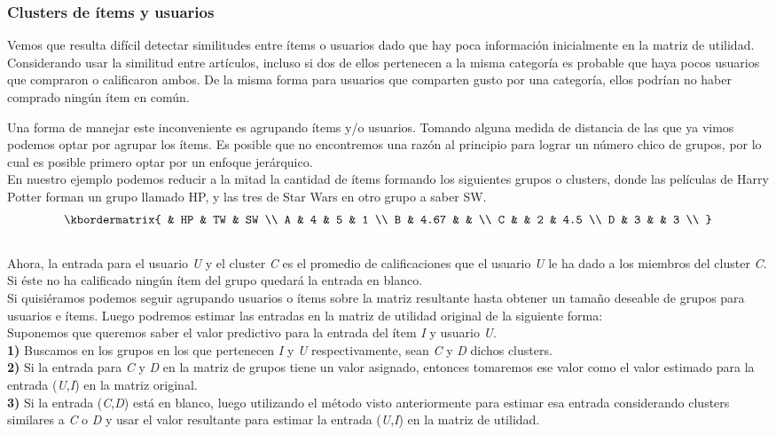 \subsubsection{Clusters de ítems y usuarios}

Vemos que resulta difícil detectar similitudes entre ítems o usuarios dado que hay poca información inicialmente en la matriz de utilidad. Considerando usar la similitud entre artículos, incluso si dos de ellos pertenecen a la misma categoría es probable que haya pocos usuarios que compraron o calificaron ambos. De la misma forma para usuarios que comparten gusto por una categoría, ellos podrían no haber comprado ningún ítem en común. \par

Una forma de manejar este inconveniente es agrupando ítems y/o usuarios. Tomando alguna medida de distancia de las que ya vimos podemos optar por agrupar los ítems. Es posible que no encontremos una razón al principio para lograr un número chico de grupos, por lo cual es posible primero optar por un enfoque jerárquico. \\
En nuestro ejemplo podemos reducir a la mitad la cantidad de ítems formando los siguientes grupos o clusters, donde las películas de Harry Potter forman un grupo llamado HP, y las tres de Star Wars en otro grupo a saber SW.
				\[
				\kbordermatrix{
					&	HP & TW & SW \\
				A	&	4  & 5  & 1  \\
				B	&	4.67  &   &   \\ 
				C	&	   & 2   & 4.5   \\ 
				D	&	3   &   &   3 \\
				}
				\]
\\		
Ahora, la entrada para el usuario \textit{U} y el cluster \textit{C} es el promedio de calificaciones que el usuario \textit{U} le ha dado a los miembros del cluster \textit{C}. Si éste no ha calificado ningún ítem del grupo quedará la entrada en blanco.\\
Si quisiéramos podemos seguir agrupando usuarios o ítems sobre la matriz resultante hasta obtener un tamaño deseable de grupos para usuarios e ítems. Luego podremos estimar las entradas en la matriz de utilidad original de la siguiente forma:\\
Suponemos que queremos saber el valor predictivo para la entrada del ítem \textit{I} y usuario \textit{U}.\\
\textbf{1)} Buscamos en los grupos en los que pertenecen \textit{I} y \textit{U} respectivamente, sean \textit{C} y \textit{D} dichos clusters.\\
\textbf{2)} Si la entrada para \textit{C} y \textit{D} en la matriz de grupos tiene un valor asignado, entonces tomaremos ese valor como el valor estimado para la entrada (\textit{U},\textit{I}) en la matriz original.\\
\textbf{3)} Si la entrada (\textit{C},\textit{D}) está en blanco, luego utilizando el método visto anteriormente para estimar esa entrada considerando clusters similares a \textit{C} o \textit{D} y usar el valor resultante para estimar la entrada (\textit{U},\textit{I}) en la matriz de utilidad.\\

